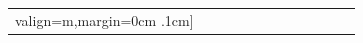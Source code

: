 \documentclass[conference]{IEEEtran}
\begin{document}
\begin{figure}
\begin{center}
\begin{tabular}{| x{1.11cm} | x{.75cm} | x{.75cm} || x{1.11cm} | x{.75cm} | x{.75cm} || x{1.11cm} | x{.75cm} | x{.75cm} || x{1.11cm} | x{.75cm} | x{.75cm} |}
valign=m,margin=0cm .1cm]
\end{tabular}
\end{center}
\end{figure}
\end{document}
